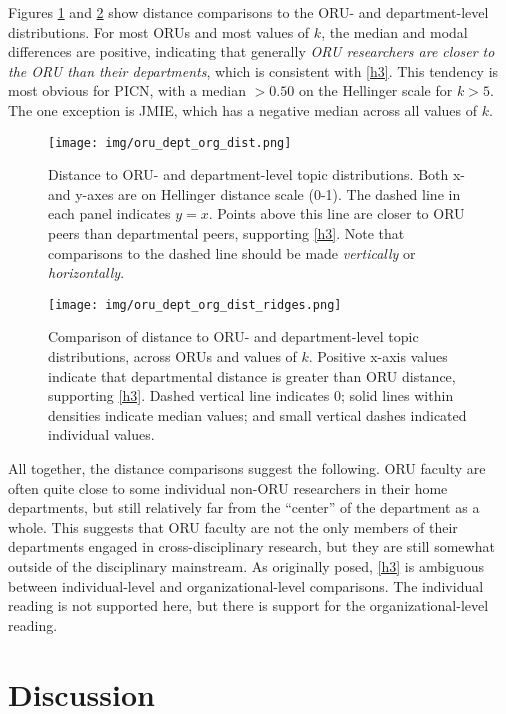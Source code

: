 \documentclass[
  11pt,
]{article}
\begin{document}
Figures \ref{fig.silhouette_org} and \ref{fig.ridges_org} show distance comparisons to the ORU- and department-level distributions. For most ORUs and most values of \(k\), the median and modal differences are positive, indicating that generally \emph{ORU researchers are closer to the ORU than their departments}, which is consistent with \ref{h3}. This tendency is most obvious for PICN, with a median \(>0.50\) on the Hellinger scale for \(k>5\). The one exception is JMIE, which has a negative median across all values of \(k\).

\begin{figure}
\centering
\texttt{[image: img/oru\_dept\_org\_dist.png]}
\caption{Distance to ORU- and department-level topic distributions. Both x- and y-axes are on Hellinger distance scale (0-1). The dashed line in each panel indicates \(y=x\). Points above this line are closer to ORU peers than departmental peers, supporting \ref{h3}. Note that comparisons to the dashed line should be made \emph{vertically} or \emph{horizontally}. \label{fig.silhouette_org}}
\end{figure}

\begin{figure}
\centering
\texttt{[image: img/oru\_dept\_org\_dist\_ridges.png]}
\caption{Comparison of distance to ORU- and department-level topic distributions, across ORUs and values of \(k\). Positive x-axis values indicate that departmental distance is greater than ORU distance, supporting \ref{h3}. Dashed vertical line indicates 0; solid lines within densities indicate median values; and small vertical dashes indicated individual values.\label{fig.ridges_org}}
\end{figure}

All together, the distance comparisons suggest the following. ORU faculty are often quite close to some individual non-ORU researchers in their home departments, but still relatively far from the ``center'' of the department as a whole. This suggests that ORU faculty are not the only members of their departments engaged in cross-disciplinary research, but they are still somewhat outside of the disciplinary mainstream. As originally posed, \ref{h3} is ambiguous between individual-level and organizational-level comparisons. The individual reading is not supported here, but there is support for the organizational-level reading.

\hypertarget{discussion}{%
\section{Discussion}\label{discussion}}
\end{document}
